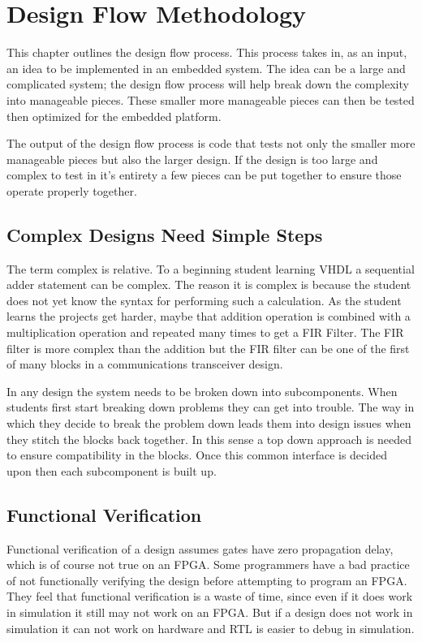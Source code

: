 \chapter{Design Flow Methodology}
	
This chapter outlines the design flow process. This process takes in, as an input, an idea to be implemented in an embedded system. The idea can be a large and complicated system; the design flow process will help break down the complexity into manageable pieces. These smaller more manageable pieces can then be tested then optimized for the embedded platform. 

The output of the design flow process is code that tests not only the smaller more manageable pieces but also the larger design. If the design is too large and complex to test in it's entirety a few pieces can be put together to ensure those operate properly together. 

\section{Complex Designs Need Simple Steps}

The term complex is relative. To a beginning student learning \ac{VHDL} a sequential adder statement can be complex. The reason it is complex is because the student does not yet know the syntax for performing such a calculation. As the student learns the projects get harder, maybe that addition operation is combined with a multiplication operation and repeated many times to get a \ac{FIR} Filter.  The \ac{FIR} filter is more complex than the addition but the \ac{FIR} filter can be one of the first of many blocks in a communications transceiver design. 

In any design the system needs to be broken down into subcomponents. When students first start breaking down problems they can get into trouble. The way in which they decide to break the problem down leads them into design issues when they stitch the blocks back together. In this sense a top down approach is needed to ensure compatibility in the blocks. Once this common interface is decided upon then each subcomponent is built up.
	
\section{Functional Verification}

Functional verification of a design assumes gates have zero propagation delay, which is of course not true on an \ac{FPGA}. Some programmers have a bad practice of not functionally verifying the design before attempting to program an \ac{FPGA}. They feel that functional verification is a waste of time, since even if it does work in simulation it still may not work on an \ac{FPGA}. But if a design does not work in simulation it can not work on hardware and \ac{RTL} is easier to debug in simulation.

